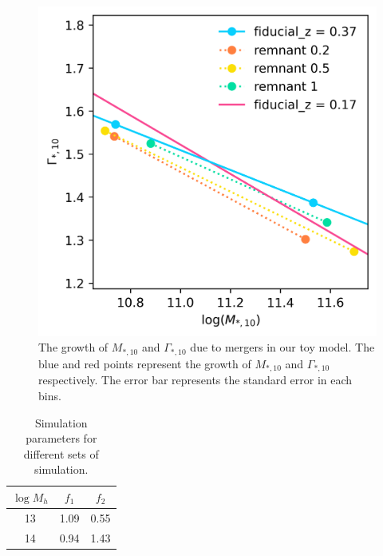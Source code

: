 \documentclass[fleqn,usenatbib]{mnras}
\begin{document}
\begin{figure}
    \centering
    \includegraphics[width=0.8\linewidth]{figure/toy_model.png}
    \caption{The growth of $M_{*,10}$ and $\Gamma_{*,10}$ due to mergers in our toy model. The blue and red points represent the growth of $M_{*,10}$ and $\Gamma_{*,10}$ respectively. The error bar represents the standard error in each bins.}
    \label{fig:toy}
\end{figure}
\begin{table}
    \centering
    \caption{Simulation parameters for different sets of simulation. }
    \label{tab:facc}
    \begin{tabular}{ccc}
        \hline
        $\log M_h$ & $f_1$ & $f_2$  \\
        \hline
        13& 1.09 & 0.55  \\
        14 & 0.94 & 1.43  \\
        
        \hline
    \end{tabular}
\end{table}
\end{document}
